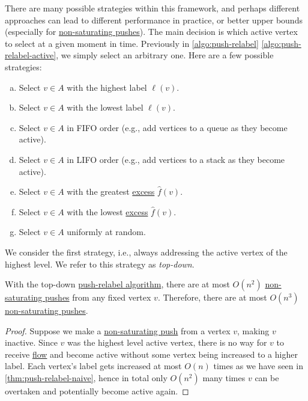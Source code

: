 There are many possible strategies within this framework, and perhaps different approaches can lead to different performance in practice, or better upper bounds (especially for \hyperref[algo:push-relabel-push-non-saturating]{non-saturating pushes}). The main decision is which active vertex to select at a given moment in time. Previously in \autoref{algo:push-relabel} \autoref{algo:push-relabel-active}, we simply select an arbitrary one. Here are a few possible strategies:
\begin{enumerate}[(a)]
	\item Select \(v \in A\) with the highest label \(\ell (v)\).
	\item Select \(v \in A\) with the lowest label \(\ell (v)\).
	\item Select \(v \in A\) in FIFO order (e.g., add vertices to a queue as they become active).
	\item Select \(v \in A\) in LIFO order (e.g., add vertices to a stack as they become active).
	\item Select \(v \in A\) with the greatest \hyperref[def:excess]{excess} \(\hat{f} (v)\).
	\item Select \(v \in A\) with the lowest \hyperref[def:excess]{excess} \(\hat{f} (v)\).
	\item Select \(v \in A\) uniformly at random.
\end{enumerate}

We consider the first strategy, i.e., always addressing the active vertex of the highest level. We refer to this strategy as \emph{top-down}.

\begin{lemma}\label{lma:push-relabel-top-down}
	With the top-down \hyperref[algo:push-relabel]{push-relabel algorithm}, there are at most \(O(n^2)\) \hyperref[algo:push-relabel-push-non-saturating]{non-saturating pushes} from any fixed vertex \(v\). Therefore, there are at most \(O(n^3)\) \hyperref[algo:push-relabel-push-non-saturating]{non-saturating pushes}.
\end{lemma}
\begin{proof}
	Suppose we make a \hyperref[algo:push-relabel-push-non-saturating]{non-saturating push} from a vertex \(v\), making \(v\) inactive. Since \(v\) was the highest level active vertex, there is no way for \(v\) to receive \hyperref[def:flow]{flow} and become active without some vertex being increased to a higher label. Each vertex's label gets increased at most \(O(n)\) times as we have seen in \autoref{thm:push-relabel-naive}, hence in total only \(O(n^2)\) many times \(v\) can be overtaken and potentially become active again.
\end{proof}

